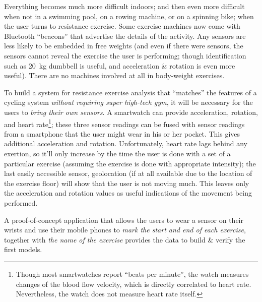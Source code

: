 
Everything becomes much more difficult indoors; and then even more difficult when not in a swimming pool, on a rowing machine, or on a spinning bike; when the user turns to resistance exercise. Some exercise machines now come with Bluetooth ``beacons'' that advertise the details of the activity. Any sensors are less likely to be embedded in free weights (and even if there were sensors, the sensors cannot reveal the exercise the user is performing; though identification such as \SI{20}{\kg} dumbbell is useful, and acceleration \& rotation is even more useful). There are no machines involved at all in body-weight exercises. 

To build a system for resistance exercise analysis that ``matches'' the features of a cycling system \emph{without requiring super high-tech gym}, it will be necessary for the users to \emph{bring their own sensors}. A smartwatch can provide acceleration, rotation, and heart rate\footnote{Though most smartwatches report ``beats per minute'', the watch measures changes of the blood flow velocity, which is directly correlated to heart rate. Nevertheless, the watch does not measure heart rate itself.}; these three sensor readings can be fused with sensor readings from a smartphone that the user might wear in his or her pocket. This gives additional acceleration and rotation. Unfortunately, heart rate lags behind any exertion, so it'll only increase by the time the user is done with a set of a particular exercise (assuming the exercise is done with appropriate intensity); the last easily accessible sensor, geolocation (if at all available due to the location of the exercise floor) will show that the user is not moving much. This leaves only the acceleration and rotation values as useful indications of the movement being performed. 

A proof-of-concept application that allows the users to wear a sensor on their wrists and use their mobile phones to \emph{mark the start and end of each exercise}, together with \emph{the name of the exercise} provides the data to build \& verify the first models. 


